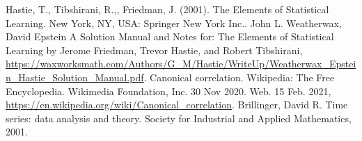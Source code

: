 \begin{thebibliography}{9}
Hastie, T., Tibshirani, R.,, Friedman, J. (2001). The Elements of Statistical Learning. New York, NY, USA: Springer New York Inc..
John L. Weatherwax, David Epstein A Solution Manual and Notes for: The Elements of Statistical Learning by Jerome Friedman, Trevor Hastie, and Robert Tibshirani,
\url{https://waxworksmath.com/Authors/G\_M/Hastie/WriteUp/Weatherwax\_Epstein\_Hastie\_Solution\_Manual.pdf}.
Canonical correlation. Wikipedia: The Free Encyclopedia. Wikimedia Foundation, Inc. 30 Nov 2020. Web. 15 Feb. 2021, \url{https://en.wikipedia.org/wiki/Canonical\_correlation}.
Brillinger, David R. Time series: data analysis and theory. Society for Industrial and Applied Mathematics, 2001.
\end{thebibliography}
